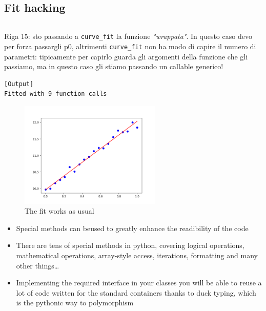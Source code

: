 \subsection{Fit hacking}

\inputminted{python}{snippets/test_callable.py}
Riga 15: sto passando a \texttt{curve\_fit} la funzione \textit{"wrappata"}. In questo caso devo per forza passargli p0, altrimenti \texttt{curve\_fit} non ha modo di capire il numero di parametri: tipicamente per capirlo guarda gli argomenti della funzione che gli passiamo, ma in questo caso gli stiamo passando un callable generico!
\begin{verbatim}
[Output]
Fitted with 9 function calls
\end{verbatim} 

\begin{figure}[ht]
    \centering
    \includegraphics[width=0.6\textwidth]{lez5/fit.png}
    \caption{The fit works as usual}
    \label{fit}
\end{figure}
\FloatBarrier

\vfill
\hfill

\begin{tcolorbox}[width=\textwidth,colback={white},title={Summary: },colbacktitle=cyan,coltitle=black]
  \begin{itemize}
    \item Special methods can beused to greatly enhance the readibility of the code
    \item There are tens of special methods in python, covering logical operations,
          mathematical operations, array-style access, iterations, formatting and
          many other things\dots
    \item Implementing the required interface in your classes you will be able
          to reuse a lot of code written for the standard containers thanks to
          duck typing, which is the pythonic way to polymorphism
   \end{itemize}  
\end{tcolorbox}

